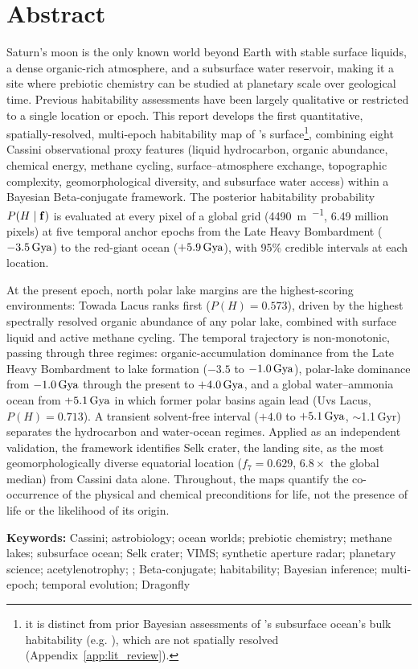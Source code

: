 
\chapter*{Abstract}

Saturn's moon \titan{} is the only known world beyond Earth with stable
surface liquids, a dense organic-rich atmosphere, and a subsurface water
reservoir, making it a site where prebiotic chemistry can be studied at
planetary scale over geological time.  Previous habitability assessments
have been largely qualitative or restricted to a single location or epoch.
This report develops the first quantitative, spatially-resolved, multi-epoch
habitability map of \titan{}'s surface\footnote{it is distinct from prior Bayesian assessments of \titan{}'s subsurface ocean's bulk habitability (e.g. \citet{Affholder2021}), which are not spatially resolved (Appendix~\ref{app:lit_review}).},
combining eight Cassini observational
proxy features (liquid hydrocarbon, organic abundance, chemical energy,
methane cycling, surface--atmosphere exchange, topographic complexity,
geomorphological diversity, and subsurface water access) within a Bayesian
Beta-conjugate framework.  The posterior habitability probability
$P(H \mid \mathbf{f})$ is evaluated at every pixel of a global grid
(\SI{4490}{\metre\per{}}, 6.49 million pixels) at five temporal anchor
epochs from the Late Heavy Bombardment ($-3.5\,\text{Gya}$) to the red-giant ocean
($+5.9\,\text{Gya}$), with 95\% credible intervals at each location.

At the present epoch, north polar lake margins are the highest-scoring
environments: Towada Lacus ranks first ($P(H) = 0.573$), driven by the highest
spectrally resolved organic abundance of any polar lake, combined with surface
liquid and active methane cycling.  The temporal trajectory is non-monotonic,
passing through three regimes: organic-accumulation dominance from the Late
Heavy Bombardment to lake formation ($-3.5$ to $-1.0\,\text{Gya}$), polar-lake dominance
from $-1.0\,\text{Gya}$ through the present to $+4.0\,\text{Gya}$, and a
global water--ammonia ocean from $+5.1\,\text{Gya}$ in which former polar basins again
lead (Uvs Lacus, $P(H) = 0.713$).  A transient solvent-free interval
($+4.0$ to $+5.1\,\text{Gya}$, $\sim$1.1\,Gyr) separates the hydrocarbon and water-ocean regimes.  Applied as
an independent validation, the framework identifies Selk crater, the
\dragonfly{} landing site, as the most geomorphologically diverse equatorial
location ($f_7 = 0.629$, $6.8\times$ the global median) from Cassini data
alone.  Throughout, the maps quantify the co-occurrence of the physical and
chemical preconditions for life, not the presence of life or the likelihood of
its origin.

\vspace{1em}
\noindent\textbf{Keywords:} Cassini; astrobiology; ocean worlds; prebiotic chemistry; methane lakes; subsurface ocean;
Selk crater; VIMS; synthetic aperture radar; planetary science; acetylenotrophy; \titan{}; Beta-conjugate; 
habitability; Bayesian inference; multi-epoch; temporal evolution; Dragonfly
